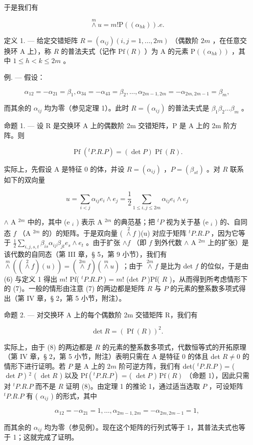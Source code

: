 于是我们有

\[
\stackrel {m} {\wedge} u = m! \mathrm{P} ((\alpha_ {h k})). e.\tag{6}
\]

定义 1. --- 给定交错矩阵 \(R = (\alpha_{ij}) (i, j = 1, \ldots, 2m)\) （偶数阶 \(2m\) ，在任意交换环 A 上），称 \(R\) 的普法夫式（记作 \(\mathrm{Pf}(R)\) ）为 A 的元素 \(\mathrm{P}((\alpha_{hk}))\) ，其中 \(1 \leqslant h < k \leqslant 2m\) 。

例. --- 假设：

\[
\alpha_ {1 2} = - \alpha_ {2 1} = \beta_ {1}, \alpha_ {3 4} = - \alpha_ {4 3} = \beta_ {2}, \dots , \alpha_ {2 m - 1, 2 m} = - \alpha_ {2 m, 2 m - 1} = \beta_ {m},
\]

而其余的 \(\alpha_{ij}\) 均为零（参见定理 1）。此时 \(R = (\alpha_{ij})\) 的普法夫式是 \(\beta_1\beta_2\ldots\beta_m\) 。

命题 1. --- 设 R 是交换环 A 上的偶数阶 2m 交错矩阵，P 是 A 上的 2m 阶方阵。则

\[
\operatorname{Pf} (^ {t} P. R. P) = (\det P) \operatorname{Pf} (R).\tag{7}
\]

实际上，先假设 A 是特征 0 的体，并设 \(R = (\alpha_{ij})\) ，\(P = (\beta_{st})\) 。对 \(R\) 联系如下的双向量

\[
u = \sum_ {i <   j} \alpha_ {i j} e _ {i} \wedge e _ {j} = \frac {1}{2} \sum_ {1 \leqslant i, j \leqslant 2 m} \alpha_ {i j} e _ {i} \wedge e _ {j}
\]

\(\wedge\) A \(^{2m}\) 中的，其中 (e \(_i\) ) 表示 A \(^{2m}\) 的典范基；把 \(^t P\) 视为关于基 (e \(_i\) ) 的、自同态 \(f\) （A \(^{2m}\) 的）的矩阵。于是双向量 ( \(\overset{2}{\wedge} f\) )(u) 对应于矩阵 \(^t P.R.P\) ，因为它等于 \(\frac{1}{2}\sum_{i,j,s,t}\beta_{is}\alpha_{ij}\beta_{jt}e_s\wedge e_t\) 。由于扩张 \(\wedge f\) （即 \(f\) 到外代数 \(\wedge\) A \(^{2m}\) 上的扩张）是该代数的自同态（第 III 章，§ 5，第 9 小节），我们有 \(\overset{m}{\wedge}((\overset{2}{\wedge}f)(u)) = (\overset{2m}{\wedge}f)(\overset{m}{\wedge}u)\) ；由于 \(\overset{2m}{\wedge} f\) 是比为 det \(f\) 的位似，于是由 (6) 与定义 1 得出 \(m!\) Pf( \(^t P.R.P\) ) = \(m!\) (det \(P\) )Pf( \(R\) )，从而得到所考虑情形下的 (7)。一般的情形由注意 (7) 的两边都是矩阵 \(R\) 与 \(P\) 的元素的整系数多项式得出（第 IV 章，§ 2，第 5 小节，附注）。

命题 2. --- 对交换环 A 上的每个偶数阶 2m 交错矩阵 R，我们有

\[
\det R = (\operatorname{Pf} (R)) ^ {2}.\tag{8}
\]

实际上，由于 (8) 的两边都是 \(R\) 的元素的整系数多项式，代数恒等式的开拓原理（第 IV 章，§ 2，第 5 小节，附注）表明只需在 A 是特征 0 的体且 det \(R \neq 0\) 的情形下进行证明。若 \(P\) 是 A 上的 \(2m\) 阶可逆方阵，我们有 det( \(^{t}P.R.P\) ) = ( \(\det P\) ) \(^{2}\) ( \(\det R\) ) 以及 \(\mathrm{Pf}(^{t}P.R.P)\) = ( \(\det P\) ) \(\mathrm{Pf}(R)\) （命题 1），因此只需对 \(^{t}P.R.P\) 而不是 \(R\) 证明 (8)。由定理 1 的推论 1，通过适当选取 \(P\) ，可设矩阵 \(^{t}P.R.P\) 有 ( \(\alpha_{ij}\) ) 的形式，其中

\[
\alpha_ {1 2} = - \alpha_ {2 1} = 1, \dots , \alpha_ {2 m - 1, 2 m} = - \alpha_ {2 m, 2 m - 1} = 1,
\]

而其余的 \(\alpha_{ij}\) 均为零（参见例）。现在这个矩阵的行列式等于 1，其普法夫式也等于 1；这就完成了证明。

